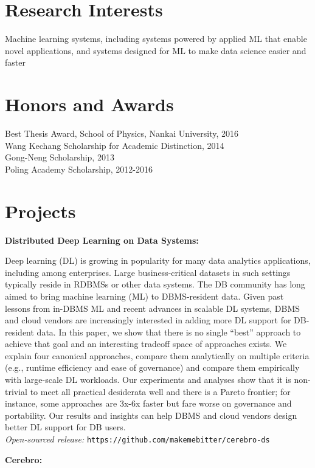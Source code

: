 \documentclass[margin,line]{res}
\begin{document}
\begin{resume}
\section{\sc Research Interests}
Machine learning systems, including systems powered by applied ML that enable novel applications, and systems designed for ML to make data science easier and faster

\section{\sc Honors and Awards} 
Best Thesis Award, School of Physics, Nankai University, 2016\\
Wang Kechang Scholarship for Academic Distinction, 2014\\
Gong-Neng Scholarship, 2013\\
Poling Academy Scholarship, 2012-2016

\section{\sc Projects}
{\bf Distributed Deep Learning on Data Systems:}

Deep learning (DL) is growing in popularity for many data analytics applications, including among enterprises. Large business-critical datasets in such settings typically reside in RDBMSs or other data systems. The DB community has long aimed to bring machine learning (ML) to DBMS-resident data. Given past lessons from in-DBMS ML and recent advances in scalable DL systems, DBMS and cloud vendors are increasingly interested in adding more DL support for DB-resident data. In this paper, we show that there is no single ``best'' approach to achieve that goal and an interesting tradeoff space of approaches exists. We explain four canonical approaches, compare them analytically on multiple criteria (e.g., runtime efficiency and ease of governance) and compare them empirically with large-scale DL workloads. Our experiments and analyses show that it is non-trivial to meet all practical desiderata well and there is a Pareto frontier; for instance, some approaches are 3x-6x faster but fare worse on governance and portability. Our results and insights can help DBMS and cloud vendors design better DL support for DB users.\\
\textit{Open-sourced release: }\texttt{https://github.com/makemebitter/cerebro-ds}

{\bf Cerebro:}


\end{resume}
\end{document}
